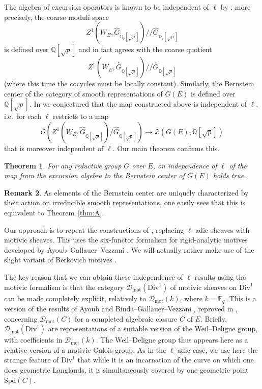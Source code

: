 \documentclass[11pt]{amsart}
\numberwithin{equation}{section}
\newtheorem{theorem}{Theorem}
\numberwithin{theorem}{section}
\theoremstyle{definition}
\newtheorem{remark}[theorem]{Remark}
\begin{document}
The algebra of excursion operators is known to be independent of $\ell$ by \cite{DHKM}; more precisely, the coarse moduli space
\[
Z^1(W_E,\widehat{G}_{\mathbb Q_\ell[\sqrt{p}]})/\! /\widehat{G}_{\mathbb Q_\ell[\sqrt{p}]}
\]
is defined over $\mathbb Q[\sqrt{p}]$ and in fact agrees with the coarse quotient
\[
Z^1(W_E,\widehat{G}_{\mathbb Q[\sqrt{p}]})/\! /\widehat{G}_{\mathbb Q[\sqrt{p}]}
\]
(where this time the cocycles must be locally constant). Similarly, the Bernstein center of the category of smooth representations of $G(E)$ is defined over $\mathbb Q[\sqrt{p}]$. In \cite[Conjecture I.9.5]{FarguesScholze} we conjectured that the map constructed above is independent of $\ell$, i.e.~for each $\ell$ restricts to a map
\[
\mathcal O(Z^1(W_E,\widehat{G}_{\mathbb Q[\sqrt{p}]})/\widehat{G}_{\mathbb Q[\sqrt{p}]})\to \mathcal{Z}(G(E),\mathbb Q[\sqrt{p}])
\]
that is moreover independent of $\ell$. Our main theorem confirms this.

\begin{theorem}\label{thm:B} For any reductive group $G$ over $E$, \cite[Conjecture I.9.5]{FarguesScholze} on independence of $\ell$ of the map from the excursion algebra to the Bernstein center of $G(E)$ holds true.
\end{theorem}

\begin{remark} As elements of the Bernstein center are uniquely characterized by their action on irreducible smooth representations, one easily sees that this is equivalent to Theorem~\ref{thm:A}.
\end{remark}

Our approach is to repeat the constructions of \cite{FarguesScholze}, replacing $\ell$-adic sheaves with motivic sheaves. This uses the six-functor formalism for rigid-analytic motives developed by Ayoub--Gallauer--Vezzani \cite{AyoubGallauerVezzani}. We will actually rather make use of the slight variant of Berkovich motives \cite{BerkovichMotives}.

The key reason that we can obtain these independence of $\ell$ results using the motivic formalism is that the category $\mathcal D_{\mathrm{mot}}(\mathrm{Div}^1)$ of motivic sheaves on $\mathrm{Div}^1$ can be made completely explicit, relatively to $\mathcal D_{\mathrm{mot}}(k)$, where $k=\overline{\mathbb F}_q$. This is a version of the results of Ayoub and Binda--Gallauer--Vezzani \cite{BindaGallauerVezzani}, reproved in \cite{BerkovichMotives}, concerning $\mathcal D_{\mathrm{mot}}(C)$ for a completed algebraic closure $C$ of $E$. Briefly, $\mathcal D_{\mathrm{mot}}(\mathrm{Div}^1)$ are representations of a suitable version of the Weil--Deligne group, with coefficients in $\mathcal D_{\mathrm{mot}}(k)$. The Weil--Deligne group thus appears here as a relative version of a motivic Galois group. As in the $\ell$-adic case, we use here the strange feature of $\mathrm{Div}^1$ that while it is an incarnation of the curve on which one does geometric Langlands, it is simultaneously covered by one geometric point $\mathrm{Spd}(C)$.
\end{document}
